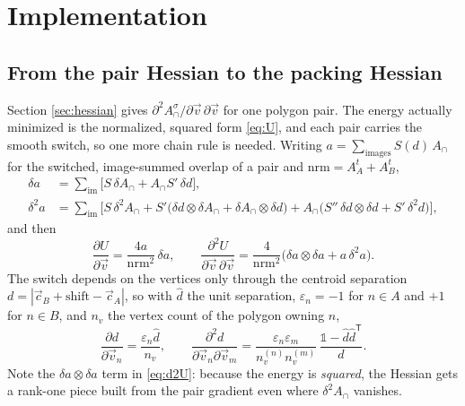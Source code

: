\documentclass[11pt]{article}
\numberwithin{equation}{section}
\newcommand{\vv}[1]{\vec{#1}}
\newcommand{\eps}{\varepsilon}
\begin{document}
\section{Implementation}\label{sec:impl}

\subsection{From the pair Hessian to the packing Hessian}
Section \ref{sec:hessian} gives $\partial^2A_\cap^\sigma/\partial\vv v\,\partial\vv v$ for one polygon
pair. The energy actually minimized is the normalized, squared form \eqref{eq:U}, and each pair carries
the smooth switch, so one more chain rule is needed. Writing $a=\sum_{\text{images}}S(d)\,A_\cap$ for the
switched, image-summed overlap of a pair and $\text{nrm}=A_A^t+A_B^t$,
\begin{align}
  \delta a&=\textstyle\sum_{\text{im}}\big[S\,\delta A_\cap+A_\cap S'\,\delta d\big],\label{eq:da}\\
  \delta^2a&=\textstyle\sum_{\text{im}}\big[S\,\delta^2A_\cap
    +S'\big(\delta d\otimes\delta A_\cap+\delta A_\cap\otimes\delta d\big)
    +A_\cap\big(S''\,\delta d\otimes\delta d+S'\,\delta^2d\big)\big],\label{eq:d2a}
\end{align}
and then
\begin{equation}\label{eq:d2U}
  \frac{\partial U}{\partial\vv v}=\frac{4a}{\text{nrm}^2}\,\delta a,\qquad
  \frac{\partial^2U}{\partial\vv v\,\partial\vv v}
  =\frac{4}{\text{nrm}^2}\Big(\delta a\otimes\delta a+a\,\delta^2a\Big).
\end{equation}
The switch depends on the vertices only through the centroid separation $d=|\vv c_B+\text{shift}-\vv c_A|$,
so with $\hat d$ the unit separation, $\eps_n=-1$ for $n\in A$ and $+1$ for $n\in B$, and $n_v$ the vertex
count of the polygon owning $n$,
\begin{equation}\label{eq:dd}
  \frac{\partial d}{\partial\vv v_n}=\frac{\eps_n\hat d}{n_v},\qquad
  \frac{\partial^2 d}{\partial\vv v_n\partial\vv v_m}
  =\frac{\eps_n\eps_m}{n_v^{(n)}n_v^{(m)}}\,\frac{\mathbb 1-\hat d\hat d^{\mathsf T}}{d}.
\end{equation}
Note the $\delta a\otimes\delta a$ term in \eqref{eq:d2U}: because the energy is \emph{squared}, the
Hessian gets a rank-one piece built from the pair gradient even where $\delta^2A_\cap$ vanishes.
\end{document}
